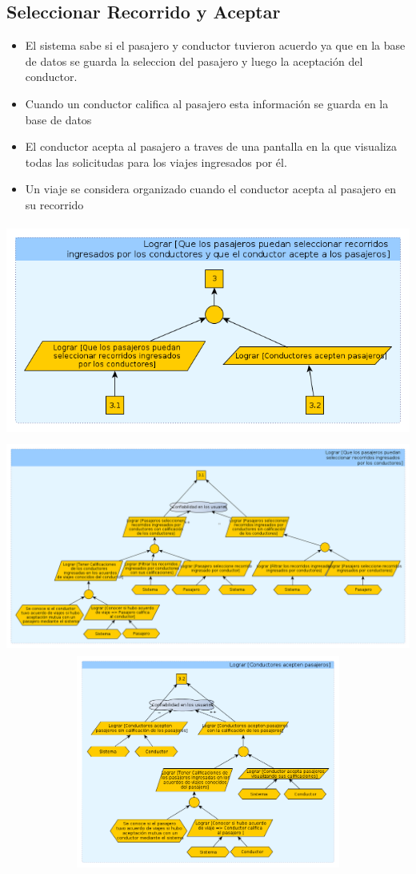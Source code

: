 \documentclass[a4paper,titlepage,10pt]{article}
\begin{document}
\subsection{Seleccionar Recorrido y Aceptar}
\begin{itemize}
\item El sistema sabe si el pasajero y conductor tuvieron acuerdo ya que en la base de datos se guarda la seleccion del pasajero y luego la aceptaci\'on del conductor.
\item Cuando un conductor califica al pasajero esta informaci\'on se guarda en la base de datos
\item El conductor acepta al pasajero a traves de una pantalla en la que visualiza todas las solicitudas para los viajes ingresados por \'el.
\item Un viaje se considera organizado cuando el conductor acepta al pasajero en su recorrido
\end{itemize}
\includegraphics[height=7cm,width=19.5cm]{imagenes/Mostrar.png}
\includegraphics[height=7cm,width=19.5cm]{imagenes/Mostrara.png}
\includegraphics[height=7cm,width=19.5cm]{imagenes/Mostrarb.png}
\end{document}
